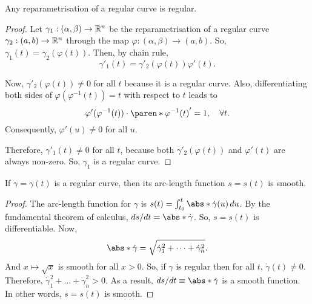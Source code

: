\documentclass[11pt]{penrose}
\begin{document}
\begin{nthm}
    Any reparametrisation of a regular curve is regular.
\end{nthm}
\begin{proof}
    Let $\gamma_1 : (\alpha, \beta) \to \mathbb{R}^n$ be the reparametrisation of a regular curve $\gamma_2 : (a,b) \to \mathbb{R}^n$ through the map $\varphi : (\alpha, \beta) \to (a, b)$. So, $\gamma_1 (t) = \gamma_2 (\varphi(t))$. Then, by chain rule,
    \begin{equation}
        \gamma'_1 (t) = \gamma'_2 (\varphi(t)) \varphi'(t).
    \end{equation}

    Now, $\gamma'_2 (\varphi(t)) \neq 0$ for all $t$ because it is a regular curve. Also, differentiating both sides of $\varphi (\varphi^{-1} (t)) = t$ with respect to $t$ leads to
    \begin{equation}
        \varphi' (\varphi^{-1} (t)) \cdot \paren*{\varphi^{-1} (t)}' = 1, \quad\forall t.
    \end{equation}
    Consequently, $\varphi' (u) \neq 0$ for all $u$.

    Therefore, $\gamma'_1 (t) \neq 0$ for all $t$, because both $\gamma'_2 (\varphi(t))$ and $\varphi'(t)$ are always non-zero. So, $\gamma_1$ is a regular curve.
\end{proof}

\begin{nthm}
    If $\gamma = \gamma(t)$ is a regular curve, then its arc-length function $s = s(t)$ is smooth.
\end{nthm}
\begin{proof}
    The arc-length function for $\gamma$ is $s(t) = \int_{t_0}^{t} \abs*{\dot{\gamma}(u)} \,du$. By the fundamental theorem of calculus, $ds/dt = \abs*{\dot{\gamma}}$. So, $s = s(t)$ is differentiable. Now,
    \begin{equation}
        \abs*{\dot{\gamma}} = \sqrt{\dot{\gamma}_1^2 + \dots + \dot{\gamma}_n^2}.
    \end{equation}
    And $x \mapsto \sqrt{x}$ is smooth for all $x > 0$. So, if $\gamma$ is regular then for all $t$, $\dot{\gamma}(t) \neq 0$. Therefore, $\dot{\gamma}_1^2 + \dots + \dot{\gamma}_n^2 > 0$. As a result, $ds/dt \equiv \abs*{\dot{\gamma}}$ is a smooth function. In other words, $s = s(t)$ is smooth.
\end{proof}
\end{document}
